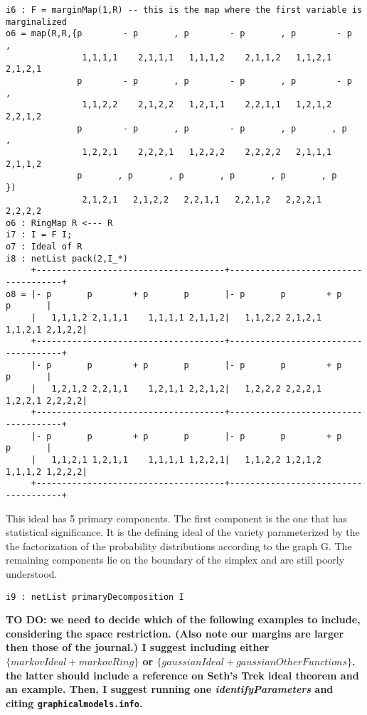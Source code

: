 \documentclass{article}
\theoremstyle{definition}
\begin{document}
\begin{verbatim}
i6 : F = marginMap(1,R) -- this is the map where the first variable is marginalized
o6 = map(R,R,{p        - p       , p        - p       , p        - p       ,
               1,1,1,1    2,1,1,1   1,1,1,2    2,1,1,2   1,1,2,1    2,1,2,1   
              p        - p       , p        - p       , p        - p       , 
               1,1,2,2    2,1,2,2   1,2,1,1    2,2,1,1   1,2,1,2    2,2,1,2  
              p        - p       , p        - p       , p       , p       , 
               1,2,2,1    2,2,2,1   1,2,2,2    2,2,2,2   2,1,1,1   2,1,1,2  
              p       , p       , p       , p       , p       , p       })
               2,1,2,1   2,1,2,2   2,2,1,1   2,2,1,2   2,2,2,1   2,2,2,2
o6 : RingMap R <--- R
i7 : I = F I;
o7 : Ideal of R
i8 : netList pack(2,I_*)
     +-------------------------------------+-------------------------------------+
o8 = |- p       p        + p       p       |- p       p        + p       p       |
     |   1,1,1,2 2,1,1,1    1,1,1,1 2,1,1,2|   1,1,2,2 2,1,2,1    1,1,2,1 2,1,2,2|
     +-------------------------------------+-------------------------------------+
     |- p       p        + p       p       |- p       p        + p       p       |
     |   1,2,1,2 2,2,1,1    1,2,1,1 2,2,1,2|   1,2,2,2 2,2,2,1    1,2,2,1 2,2,2,2|
     +-------------------------------------+-------------------------------------+
     |- p       p        + p       p       |- p       p        + p       p       |
     |   1,1,2,1 1,2,1,1    1,1,1,1 1,2,2,1|   1,1,2,2 1,2,1,2    1,1,1,2 1,2,2,2|
     +-------------------------------------+-------------------------------------+
\end{verbatim}

This ideal has 5 primary components. The first component is the one that has statistical significance. It is the defining ideal of the variety parameterized by the the factorization of the probability distributions according to the graph G. The remaining components lie on the boundary of the simplex and are still poorly understood.

\begin{verbatim}
i9 : netList primaryDecomposition I
\end{verbatim}

{\bf 
	TO DO: we need  to decide which of the following examples to include, considering the space restriction. (Also note our margins are larger then those of the journal.) I suggest including either $\{ markovIdeal + markovRing \}$ or $\{ gaussianIdeal + gaussianOtherFunctions\}$. the latter should include a reference on Seth's Trek ideal theorem and an example. Then, I suggest running one \emph{identifyParameters} and citing {\tt graphicalmodels.info}. 
}      
\end{document}
